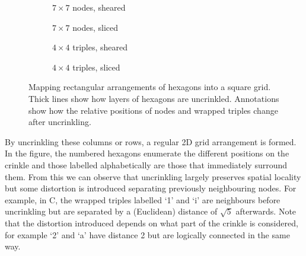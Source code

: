 			\begin{figure}
				\center
				\begin{subfigure}[b]{0.44\linewidth}
					\center
					
					
					\caption{$7 \times 7$ nodes, sheared}
					\label{fig:uncrinkling-node-sheared}
				\end{subfigure}
				\begin{subfigure}[b]{0.44\linewidth}
					\center
					
					
					\caption{$7 \times 7$ nodes, sliced}
					\label{fig:uncrinkling-node-sliced}
				\end{subfigure}
				
				\vspace{1cm}
				
				\begin{subfigure}[b]{0.44\linewidth}
					\center
					
					
					\caption{$4 \times 4$ triples, sheared}
					\label{fig:uncrinkling-sheared}
				\end{subfigure}
				\begin{subfigure}[b]{0.44\linewidth}
					\center
					
					
					\caption{$4 \times 4$ triples, sliced}
					\label{fig:uncrinkling-sliced}
				\end{subfigure}
				
				\vspace{1em}
				
				\caption{Mapping rectangular arrangements of hexagons into a square
				grid. Thick lines show how layers of hexagons are uncrinkled.
				Annotations show how the relative positions of nodes and wrapped triples
				change after uncrinkling.}
				\label{fig:uncrinkling}
			\end{figure}
			
			By uncrinkling these columns or rows, a regular 2D grid arrangement is
			formed. In the figure, the numbered hexagons enumerate the different
			positions on the crinkle and those labelled alphabetically are those that
			immediately surround them. From this we can observe that uncrinkling
			largely preserves spatial locality but some distortion is introduced
			separating previously neighbouring nodes. For example, in C, the wrapped
			triples labelled `1' and `i' are neighbours before uncrinkling but are
			separated by a (Euclidean) distance of $\sqrt{5}$ afterwards. Note that
			the distortion introduced depends on what part of the crinkle is
			considered, for example `2' and `a' have distance 2 but are logically
			connected in the same way.
		
